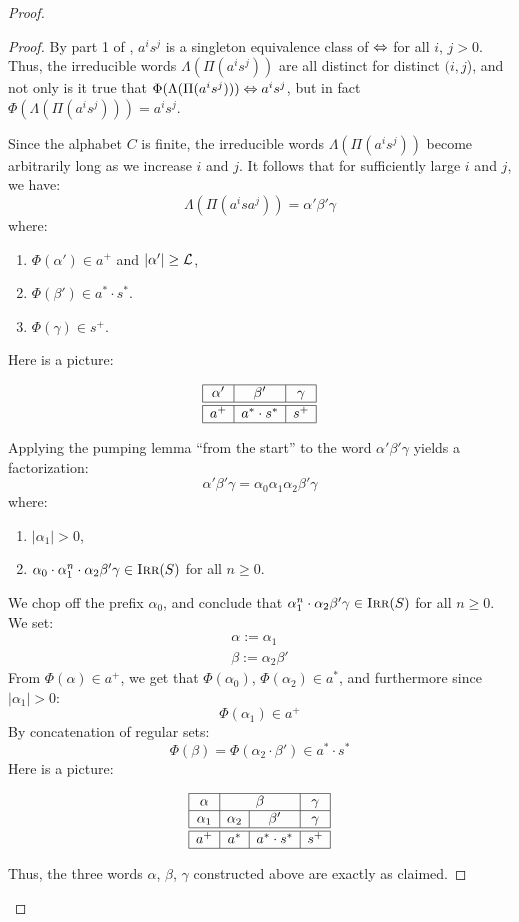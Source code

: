 \documentclass[../generics]{subfiles}
\begin{document}
\begin{proof}
\begin{proof}
By part 1 of , $a^i s^j$ is a singleton equivalence class of $\Leftrightarrow$ for all $i$, $j > 0$. Thus, the irreducible words $\Lambda(\Pi(a^i s^j))$ are all distinct for distinct $(i, j$), and not only is it true that $\Phi(\Lambda(\Pi(a^i s^j))) \Leftrightarrow a^i s^j$, but in fact $\Phi(\Lambda(\Pi(a^i s^j))) = a^i s^j$.

Since the alphabet $C$ is finite, the irreducible words $\Lambda(\Pi(a^i s^j))$ become arbitrarily long as we increase $i$ and $j$. It follows that for sufficiently large $i$ and $j$, we have:
\[
\Lambda(\Pi(a^i s a^j)) = \alpha' \beta' \gamma
\]
where:
\begin{enumerate}
\item $\Phi(\alpha') \in a^+$ and $|\alpha'| \geq \mathcal{L}$,
\item $\Phi(\beta') \in a^* \cdot s^*$.
\item $\Phi(\gamma) \in s^+$.
\end{enumerate}
Here is a picture:
\begin{ceqn}
\[
\begin{array}{|c|c|c|}
\hline
\alpha' & \beta' & \gamma \\
\hline
\hline
a^+ & a^* \cdot s^* & s^+ \\
\hline
\end{array}
\]
\end{ceqn}
Applying the pumping lemma ``from the start'' to the word $\alpha' \beta' \gamma$ yields a factorization:
\[
\alpha' \beta' \gamma = \alpha_0 \alpha_1 \alpha_2 \beta' \gamma
\]
where:
\begin{enumerate}
\item $|\alpha_1| > 0$,
\item $\alpha_0 \cdot \alpha_1^n \cdot \alpha_2 \beta' \gamma \in \textsc{Irr}(S)$ for all $n \geq 0$.
\end{enumerate}
We chop off the prefix $\alpha_0$, and conclude that $\alpha_1^n \cdot \alpha_2 \beta' \gamma \in \textsc{Irr}(S)$ for all $n \geq 0$. We set:
\begin{gather*}
\alpha := \alpha_1 \\
\beta := \alpha_2 \beta'
\end{gather*}
From $\Phi(\alpha) \in a^+$, we get that $\Phi(\alpha_0)$, $\Phi(\alpha_2) \in a^*$, and furthermore since $|\alpha_1|>0$:
\[
\Phi(\alpha_1) \in a^+
\]
By concatenation of regular sets:
\[
\Phi(\beta) = \Phi(\alpha_2 \cdot \beta') \in a^* \cdot s^*
\]
Here is a picture:
\begin{ceqn}
\[
\begin{array}{|c|c|c|c|}
\hline
\alpha & \multicolumn{2}{c|}{\beta} & \gamma \\
\hline
\alpha_1 & \alpha_2 & \beta' & \gamma \\
\hline
\hline
a^+ & a^* & a^* \cdot s^* & s^+ \\
\hline
\end{array}
\]
\end{ceqn}
Thus, the three words $\alpha$, $\beta$, $\gamma$ constructed above are exactly as claimed.
\end{proof}


\end{proof}
\end{document}
